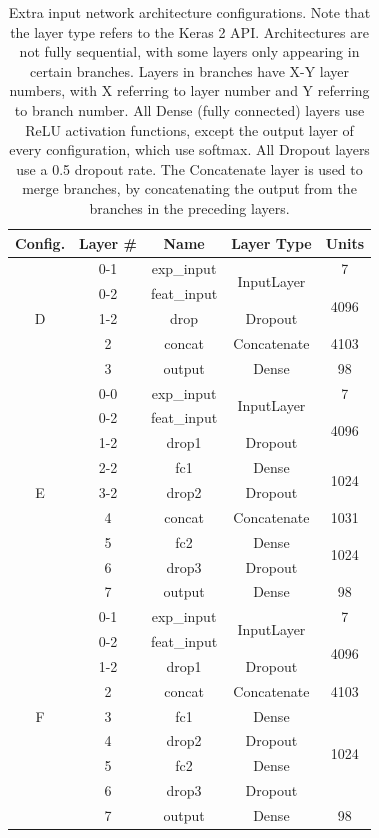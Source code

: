 \begin{table}[h!]
\begin{center}
\begin{tabular}{|c|c|c|c|c|}
\hline
\textbf{Config.} & \textbf{Layer \#} & \textbf{Name} & \textbf{Layer Type} & \textbf{Units} \\ \hline
\multirow{5}{*}{D} & 0-1 & exp\_input & \multirow{2}{*}{InputLayer} & 7 \\ \cline{2-3} \cline{5-5}
 & 0-2 & feat\_input & & \multirow{2}{*}{4096} \\ \cline{2-4}
 & 1-2 & drop & Dropout & \\ \cline{2-5}
 & 2 & concat & Concatenate & 4103 \\ \cline{2-5}
 & 3 & output & Dense & 98 \\ \hline
\multirow{9}{*}{E} & 0-0 & exp\_input & \multirow{2}{*}{InputLayer} & 7 \\ \cline{2-3} \cline{5-5}
 & 0-2 & feat\_input & & \multirow{2}{*}{4096} \\ \cline{2-4}
 & 1-2 & drop1 & Dropout & \\ \cline{2-5}
 & 2-2 & fc1 & Dense & \multirow{2}{*}{1024} \\ \cline{2-4}
 & 3-2 & drop2 & Dropout & \\ \cline{2-5}
 & 4 & concat & Concatenate & 1031 \\ \cline{2-5}
 & 5 & fc2 & Dense & \multirow{2}{*}{1024} \\ \cline{2-4}
 & 6 & drop3 & Dropout & \\ \cline{2-5}
 & 7 & output & Dense & 98 \\ \hline
\multirow{9}{*}{F} & 0-1 & exp\_input & \multirow{2}{*}{InputLayer} & 7 \\ \cline{2-3} \cline{5-5}
 & 0-2 & feat\_input & & \multirow{2}{*}{4096} \\ \cline{2-4}
 & 1-2 & drop1 & Dropout & \\ \cline{2-5}
 & 2 & concat & Concatenate & 4103 \\ \cline{2-5}
 & 3 & fc1 & Dense & \multirow{4}{*}{1024} \\ \cline{2-4}
 & 4 & drop2 & Dropout & \\ \cline{2-4}
 & 5 & fc2 & Dense & \\ \cline{2-4}
 & 6 & drop3 & Dropout & \\ \cline{2-5}
 & 7 & output & Dense & 98 \\ \hline 
\end{tabular}
\end{center}
\caption[Extra input architecture configurations]{Extra input network architecture configurations. Note that the layer type refers to the Keras 2 API. Architectures are not fully sequential, with some layers only appearing in certain branches. Layers in branches have X-Y layer numbers, with X referring to layer number and Y referring to branch number. All Dense (fully connected) layers use ReLU activation functions, except the output layer of every configuration, which use softmax. All Dropout layers use a 0.5 dropout rate. The Concatenate layer is used to merge branches, by concatenating the output from the branches in the preceding layers.}
\label{tab:ex-in-arch}
\end{table}


